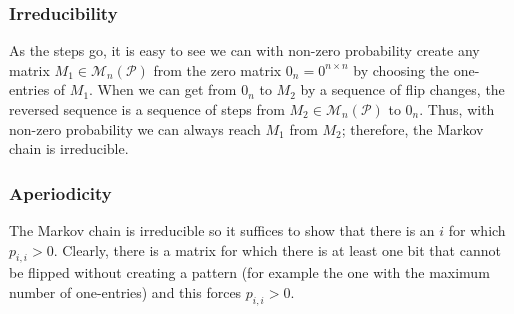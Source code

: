 \subsubsection{Irreducibility}
As the steps go, it is easy to see we can with non-zero probability create any matrix $M_1\in\mathcal{M}_n(\mathcal{P})$ from the zero matrix $0_n=0^{n\times n}$ by choosing the one-entries of $M_1$. When we can get from $0_n$ to $M_2$ by a sequence of flip changes, the reversed sequence is a sequence of steps from $M_2\in\mathcal{M}_n(\mathcal{P})$ to $0_n$. Thus, with non-zero probability we can always reach $M_1$ from $M_2$; therefore, the Markov chain is irreducible.
\subsubsection{Aperiodicity}
The Markov chain is irreducible so it suffices to show that there is an $i$ for which $p_{i,i}>0$. Clearly, there is a matrix for which there is at least one bit that cannot be flipped without creating a pattern (for example the one with the maximum number of one-entries) and this forces $p_{i,i}>0$.